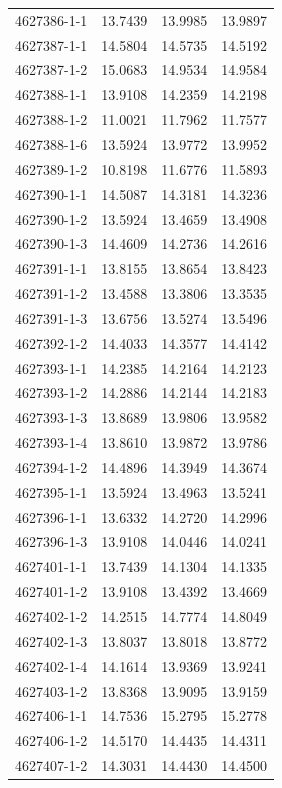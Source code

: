 \begin{longtable}{lrrr}
4627386-1-1 & 13.7439 & 13.9985 & 13.9897 \\
4627387-1-1 & 14.5804 & 14.5735 & 14.5192 \\
4627387-1-2 & 15.0683 & 14.9534 & 14.9584 \\
4627388-1-1 & 13.9108 & 14.2359 & 14.2198 \\
4627388-1-2 & 11.0021 & 11.7962 & 11.7577 \\
4627388-1-6 & 13.5924 & 13.9772 & 13.9952 \\
4627389-1-2 & 10.8198 & 11.6776 & 11.5893 \\
4627390-1-1 & 14.5087 & 14.3181 & 14.3236 \\
4627390-1-2 & 13.5924 & 13.4659 & 13.4908 \\
4627390-1-3 & 14.4609 & 14.2736 & 14.2616 \\
4627391-1-1 & 13.8155 & 13.8654 & 13.8423 \\
4627391-1-2 & 13.4588 & 13.3806 & 13.3535 \\
4627391-1-3 & 13.6756 & 13.5274 & 13.5496 \\
4627392-1-2 & 14.4033 & 14.3577 & 14.4142 \\
4627393-1-1 & 14.2385 & 14.2164 & 14.2123 \\
4627393-1-2 & 14.2886 & 14.2144 & 14.2183 \\
4627393-1-3 & 13.8689 & 13.9806 & 13.9582 \\
4627393-1-4 & 13.8610 & 13.9872 & 13.9786 \\
4627394-1-2 & 14.4896 & 14.3949 & 14.3674 \\
4627395-1-1 & 13.5924 & 13.4963 & 13.5241 \\
4627396-1-1 & 13.6332 & 14.2720 & 14.2996 \\
4627396-1-3 & 13.9108 & 14.0446 & 14.0241 \\
4627401-1-1 & 13.7439 & 14.1304 & 14.1335 \\
4627401-1-2 & 13.9108 & 13.4392 & 13.4669 \\
4627402-1-2 & 14.2515 & 14.7774 & 14.8049 \\
4627402-1-3 & 13.8037 & 13.8018 & 13.8772 \\
4627402-1-4 & 14.1614 & 13.9369 & 13.9241 \\
4627403-1-2 & 13.8368 & 13.9095 & 13.9159 \\
4627406-1-1 & 14.7536 & 15.2795 & 15.2778 \\
4627406-1-2 & 14.5170 & 14.4435 & 14.4311 \\
4627407-1-2 & 14.3031 & 14.4430 & 14.4500 \\

\end{longtable}
